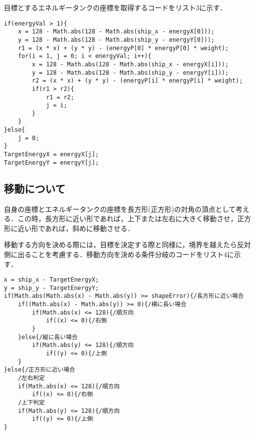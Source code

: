 \documentclass{jsarticle}
\begin{document}
目標とするエネルギータンクの座標を取得するコードをリスト3に示す．

\begin{lstlisting}[caption=目標とするエネルギータンクの座標を取得するコード(一部抜粋)]
if(energyVal > 1){
	x = 128 - Math.abs(128 - Math.abs(ship_x - energyX[0]));
	y = 128 - Math.abs(128 - Math.abs(ship_y - energyY[0]));
	r1 = (x * x) + (y * y) - (energyP[0] * energyP[0] * weight);
	for(i = 1, j = 0; i < energyVal; i++){
		x = 128 - Math.abs(128 - Math.abs(ship_x - energyX[i]));
		y = 128 - Math.abs(128 - Math.abs(ship_y - energyY[i]));
		r2 = (x * x) + (y * y) - (energyP[i] * energyP[i] * weight);
		if(r1 > r2){
			r1 = r2;
			j = i;
		}
	}
}else{
	j = 0;
}
TargetEnergyX = energyX[j];
TargetEnergyY = energyY[j];
\end{lstlisting}

\subsection{移動について}

自身の座標とエネルギータンクの座標を長方形(正方形)の対角の頂点として考える．この時，長方形に近い形であれば，上下または左右に大きく移動させ，正方形に近い形であれば，斜めに移動させる．

移動する方向を決める際には，目標を決定する際と同様に，境界を越えたら反対側に出ることを考慮する．移動方向を決める条件分岐のコードをリスト4に示す．

\begin{lstlisting}[caption=移動方向を決める条件分岐のコード(一部抜粋)]
x = ship_x - TargetEnergyX;
y = ship_y - TargetEnergyY;
if(Math.abs(Math.abs(x) - Math.abs(y)) >= shapeError){/長方形に近い場合
	if((Math.abs(x) - Math.abs(y)) >= 0){/横に長い場合
		if(Math.abs(x) <= 128){/順方向
			if((x) <= 0){/右側
		}
	}else{/縦に長い場合
		if(Math.abs(y) <= 128){/順方向
			if((y) <= 0){/上側
	}
}else{/正方形に近い場合
	/左右判定
	if(Math.abs(x) <= 128){/順方向
		if((x) <= 0){/右側
	/上下判定
	if(Math.abs(y) <= 128){/順方向
		if((y) <= 0){/上側
}
\end{lstlisting}
\end{document}
